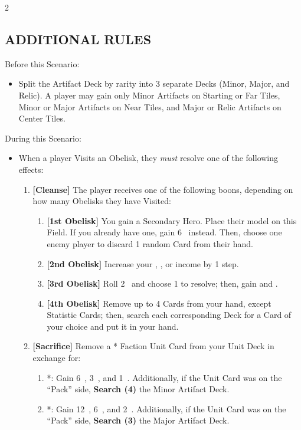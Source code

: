 \begin{multicols*}{2}
\subsection*{\MakeUppercase{Additional Rules}}
Before this Scenario:

\begin{itemize}
  \item Split the Artifact Deck by rarity into 3 separate Decks (Minor, Major, and Relic). A player may gain only Minor Artifacts on Starting or Far Tiles, Minor or Major Artifacts on Near Tiles, and Major or Relic Artifacts on Center Tiles.
\end{itemize}

During this Scenario:

\begin{itemize}
  \item When a player Visits an Obelisk, they \textit{must} resolve one of the following effects:
  \begin{enumerate}[leftmargin=15pt]
    \item \textbf{[Cleanse]} The player receives one of the following boons, depending on how many Obelisks they have Visited:
    \begin{enumerate}
      \item \textbf{[1st Obelisk]} You gain a Secondary Hero. Place their model on this Field. If you already have one, gain 6~ instead. Then, choose one enemy player to discard 1 random Card from their hand.
      \item \textbf{[2nd Obelisk]} Increase your , , or  income by 1 step.
      \item \textbf{[3rd Obelisk]} Roll 2~ and choose 1 to resolve; then, gain  and .
      \item \textbf{[4th Obelisk]} Remove up to 4 Cards from your hand, except Statistic Cards; then, search each corresponding Deck for a Card of your choice and put it in your hand.
    \end{enumerate}
    \item \textbf{[Sacrifice]} Remove a * Faction Unit Card from your Unit Deck in exchange for:
    \begin{enumerate}
      \item *: Gain 6~, 3~, and 1~. Additionally, if the Unit Card was on the ``Pack'' side, \textbf{Search (4)} the Minor Artifact Deck.
      \item *: Gain 12~, 6~, and 2~. Additionally, if the Unit Card was on the ``Pack'' side, \textbf{Search (3)} the Major Artifact Deck.

\end{enumerate}
\end{enumerate}
\end{itemize}
\end{multicols*}
